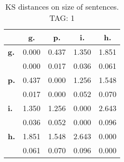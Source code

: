 \begin{table}[h!]
\begin{center}
\begin{tabular}{| l || c | c | c | c |}\hline
 & {\bf g.} & {\bf p.} & {\bf i.} & {\bf h.} \\\hline\hline
{\bf g.} & 0.000 & 0.437 & 1.350 & 1.851 \\
{\bf } & 0.000 & 0.017 & 0.036 & 0.061 \\\hline
{\bf p.} & 0.437 & 0.000 & 1.256 & 1.548 \\
{\bf } & 0.017 & 0.000 & 0.052 & 0.070 \\\hline
{\bf i.} & 1.350 & 1.256 & 0.000 & 2.643 \\
{\bf } & 0.036 & 0.052 & 0.000 & 0.096 \\\hline
{\bf h.} & 1.851 & 1.548 & 2.643 & 0.000 \\
{\bf } & 0.061 & 0.070 & 0.096 & 0.000 \\\hline
\end{tabular}
\caption{KS distances on size of sentences. TAG: 1}
\end{center}
\end{table}